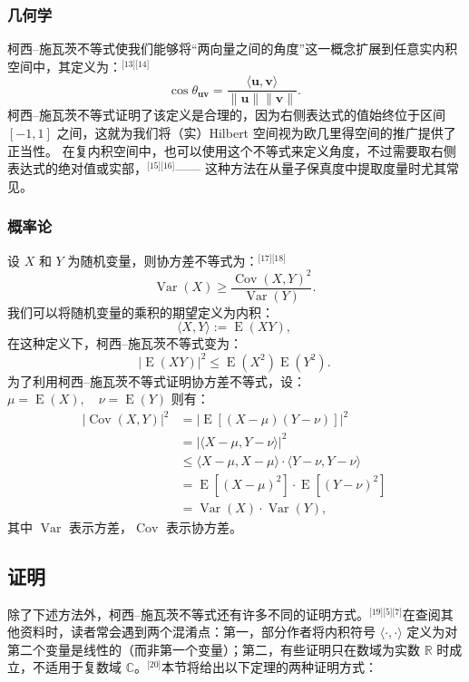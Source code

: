 \subsubsection{几何学}
柯西–施瓦茨不等式使我们能够将“两向量之间的角度”这一概念扩展到任意实内积空间中，其定义为：\(^\text{[13][14]}\)
$$
\cos \theta_{\mathbf{u}\mathbf{v}} = \frac{\langle \mathbf{u}, \mathbf{v} \rangle}{\|\mathbf{u}\| \|\mathbf{v}\|}.~
$$
柯西–施瓦茨不等式证明了该定义是合理的，因为右侧表达式的值始终位于区间 $[ -1, 1 ]$ 之间，这就为我们将（实）Hilbert 空间视为欧几里得空间的推广提供了正当性。
在复内积空间中，也可以使用这个不等式来定义角度，不过需要取右侧表达式的绝对值或实部，\(^\text{[15][16]}\)—— 这种方法在从量子保真度中提取度量时尤其常见。
\subsubsection{概率论}
设 $X$ 和 $Y$ 为随机变量，则协方差不等式为：\(^\text{[17][18]}\)
$$
\operatorname{Var}(X) \geq \frac{\operatorname{Cov}(X, Y)^2}{\operatorname{Var}(Y)}.~
$$
我们可以将随机变量的乘积的期望定义为内积：
$$
\langle X, Y \rangle := \operatorname{E}(XY),~
$$
在这种定义下，柯西–施瓦茨不等式变为：
$$
|\operatorname{E}(XY)|^2 \leq \operatorname{E}(X^2)\operatorname{E}(Y^2).~
$$
为了利用柯西–施瓦茨不等式证明协方差不等式，设：$\mu = \operatorname{E}(X), \quad \nu = \operatorname{E}(Y)$
则有：
$$
\begin{aligned}
|\operatorname{Cov}(X, Y)|^2 
&= |\operatorname{E}[(X - \mu)(Y - \nu)]|^2 \\
&= |\langle X - \mu, Y - \nu \rangle|^2 \\
&\leq \langle X - \mu, X - \mu \rangle \cdot \langle Y - \nu, Y - \nu \rangle \\
&= \operatorname{E}[(X - \mu)^2] \cdot \operatorname{E}[(Y - \nu)^2] \\
&= \operatorname{Var}(X) \cdot \operatorname{Var}(Y),
\end{aligned}~
$$
其中 $\operatorname{Var}$ 表示方差，$\operatorname{Cov}$ 表示协方差。
\subsection{证明}
除了下述方法外，柯西–施瓦茨不等式还有许多不同的证明方式。\(^\text{[19][5][7]}\)在查阅其他资料时，读者常会遇到两个混淆点：第一，部分作者将内积符号 $\langle \cdot, \cdot \rangle$ 定义为对第二个变量是线性的（而非第一个变量）；第二，有些证明只在数域为实数 $\mathbb{R}$ 时成立，不适用于复数域 $\mathbb{C}$。\(^\text{[20]}\)本节将给出以下定理的两种证明方式：

